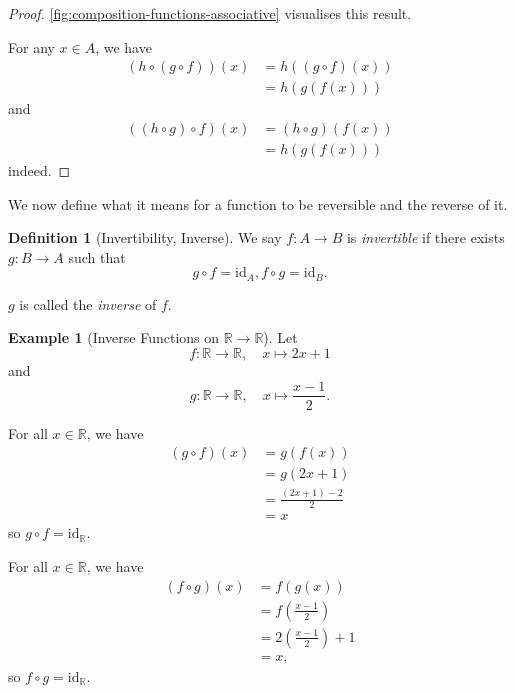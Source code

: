 \documentclass{article}
\theoremstyle{definition}
\newtheorem{definition}[theorem]{Definition}
\newtheorem{example}[theorem]{Example}
\theoremstyle{remark}
\newcommand{\pqty}[1]{\left(#1\right)}
\newcommand{\functiondomain}[3]{#1:#2\to #3}
\newcommand{\function}[5]{#1:#2\to #3,\quad #4\mapsto #5}
\newcommand{\identity}{\mathrm{id}}
\newcommand{\RR}{\mathbb{R}}
\begin{document}
\begin{proof}
    \autoref{fig:composition-functions-associative} visualises this result.

    For any \(x \in A\), we have
    \begin{align*}
        \pqty{h \circ \pqty{g \circ f}} \pqty{x} &= h\pqty{\pqty{g \circ f} \pqty{x}} \\
        &= h \pqty{g \pqty{f \pqty{x}}}
    \end{align*}
    and
    \begin{align*}
        \pqty{\pqty{h \circ g} \circ f} \pqty{x} &= \pqty{h \circ g} \pqty{f\pqty{x}} \\
        &= h \pqty{g \pqty{f \pqty{x}}}
    \end{align*}
    indeed.
\end{proof}

We now define what it means for a function to be reversible and the reverse of it.

\begin{definition}[Invertibility, Inverse]
    We say \(\functiondomain{f}{A}{B}\) is \emph{invertible} if there exists \(\functiondomain{g}{B}{A}\) such that
    \[
        g \circ f = \identity_A, f \circ g = \identity_B.
    \]

    \(g\) is called the \emph{inverse} of \(f\).
\end{definition}

\begin{example}[Inverse Functions on \(\RR \to \RR\)]
    Let
    \[
        \function{f}{\RR}{\RR}{x}{2x + 1}
    \]
    and
    \[
        \function{g}{\RR}{\RR}{x}{\frac{x - 1}{2}}.
    \]

    For all \(x \in \RR\), we have
    \begin{align*}
        \pqty{g \circ f} \pqty{x} &= g \pqty{f \pqty{x}} \\
        &= g \pqty{2x + 1} \\
        &= \frac{\pqty{2x + 1} - 2}{2} \\
        &= x
    \end{align*}
    so \(g \circ f = \identity_{\RR}\).

    For all \(x \in \RR\), we have
    \begin{align*}
        \pqty{f \circ g} \pqty{x} &= f \pqty{g \pqty{x}} \\
        &= f \pqty{\frac{x - 1}{2}} \\
        &= 2 \pqty{\frac{x - 1}{2}} + 1 \\
        &= x,
    \end{align*}
    so \(f \circ g = \identity_{\RR}\).
\end{example}
\end{document}
